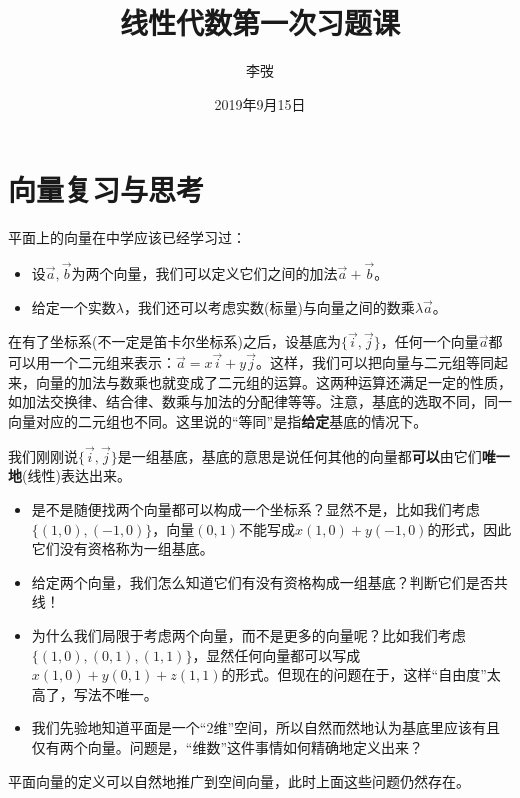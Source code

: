 \documentclass[hyperref,]{ctexart}
\title{线性代数第一次习题课}
\author{李弢}
\date{2019年9月15日}
\providecommand{\tightlist}{%
  \setlength{\itemsep}{0pt}\setlength{\parskip}{0pt}}
\begin{document}
\maketitle

{
\setcounter{tocdepth}{2}
\tableofcontents
}
\def\vec{\overrightarrow}

\section{向量复习与思考}

平面上的向量在中学应该已经学习过：

\begin{itemize}
\tightlist
\item
  设\(\vec{a},\vec{b}\)为两个向量，我们可以定义它们之间的加法\(\vec{a}+\vec{b}\)。
\item
  给定一个实数\(\lambda\)，我们还可以考虑实数(标量)与向量之间的数乘\(\lambda \vec{a}\)。
\end{itemize}

在有了坐标系(不一定是笛卡尔坐标系)之后，设基底为\(\{\vec{i},\vec{j}\}\)，任何一个向量\(\vec{a}\)都可以用一个二元组来表示：\(\vec{a}=x\vec{i}+y\vec{j}\)。这样，我们可以把向量与二元组等同起来，向量的加法与数乘也就变成了二元组的运算。这两种运算还满足一定的性质，如加法交换律、结合律、数乘与加法的分配律等等。注意，基底的选取不同，同一向量对应的二元组也不同。这里说的``等同''是指\textbf{给定}基底的情况下。

我们刚刚说\(\{\vec{i},\vec{j}\}\)是一组基底，基底的意思是说任何其他的向量都\textbf{可以}由它们\textbf{唯一地}(线性)表达出来。

\begin{itemize}
\tightlist
\item
  是不是随便找两个向量都可以构成一个坐标系？显然不是，比如我们考虑\(\{(1,0),(-1,0)\}\)，向量\((0,1)\)不能写成\(x(1,0)+y(-1,0)\)的形式，因此它们没有资格称为一组基底。
\item
  给定两个向量，我们怎么知道它们有没有资格构成一组基底？判断它们是否共线！
\item
  为什么我们局限于考虑两个向量，而不是更多的向量呢？比如我们考虑\(\{(1,0),(0,1),(1,1)\}\)，显然任何向量都可以写成\(x(1,0)+y(0,1)+z(1,1)\)的形式。但现在的问题在于，这样``自由度''太高了，写法不唯一。
\item
  我们先验地知道平面是一个``2维''空间，所以自然而然地认为基底里应该有且仅有两个向量。问题是，``维数''这件事情如何精确地定义出来？
\end{itemize}

平面向量的定义可以自然地推广到空间向量，此时上面这些问题仍然存在。
\end{document}
